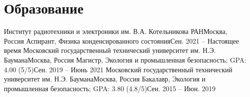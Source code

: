 

\section{Образование}\label{sec:education}
\resumeSubHeadingListStart
\resumeSubheading
{Институт радиотехники и электроники им. В.А. Котельникова РАН}{Москва, Россия}
{Аспирант, Физика конденсированного состояния}{Сен. 2021 -- Настоящее время}
\resumeSubheading
{Московский государственный технический университет им. Н.Э. Баумана}{Москва, Россия}
{Магистр, Экология и промышленная безопасность; GPA: 4.00 (5/5)}{Сен. 2019 -- Июнь 2021}
\resumeSubheading
{Московский государственный технический университет им. Н.Э. Баумана}{Москва, Россия}
{Бакалавр, Экология и промышленная безопасность; GPA: 3.80 (4.8/5)}{Сен. 2015 -- Июн. 2019}
\resumeSubHeadingListEnd